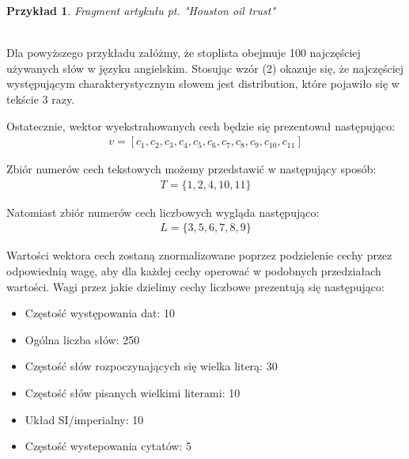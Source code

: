 \documentclass{classrep}
\newtheorem{exmp}{Przykład}[section]
\begin{document}
\begin{enumerate}
	\begin{exmp}
    Fragment artykułu pt. "Houston oil trust"  \cite{reuters} \\
     \\
    \end{exmp} 
    Dla powyższego przykładu załóżmy, że stoplista obejmuje 100 najczęściej używanych słów w języku angielskim. Stosując wzór (2) okazuje się, że najczęściej występującym charakterystycznym słowem jest distribution, które pojawiło się w tekście 3 razy. \\
\end{enumerate}
Ostatecznie, wektor wyekstrahowanych cech będzie się prezentował następująco: 
\begin{gather}
v = [c_{1}, c_{2}, c_{3}, c_{4}, c_{5}, c_{6}, c_{7}, c_{8}, c_{9}, c_{10}, c_{11}] 
\end{gather}

Zbiór numerów cech tekstowych możemy przedstawić w następujący sposób:
\begin{gather}
\label{tekstowe}
    T = \{1, 2, 4, 10, 11\}
\end{gather}

Natomiast zbiór numerów cech liczbowych wygląda następująco:
\begin{gather}
\label{liczbowe}
    L = \{3, 5, 6, 7, 8, 9\}
\end{gather}

Wartości wektora cech zostaną znormalizowane poprzez podzielenie cechy przez odpowiednią wagę, aby dla każdej cechy operować w podobnych przedziałach wartości. Wagi przez jakie dzielimy cechy liczbowe prezentują się następująco:
\begin{itemize}
    \item Częstość występowania dat: 10
    \item Ogólna liczba słów: 250
    \item Częstość słów rozpoczynających się wielka literą: 30
    \item Częstość słów pisanych wielkimi literami: 10
    \item Układ SI/imperialny: 10
    \item Częstość wystepowania cytatów: 5
\end{itemize}
\end{document}
